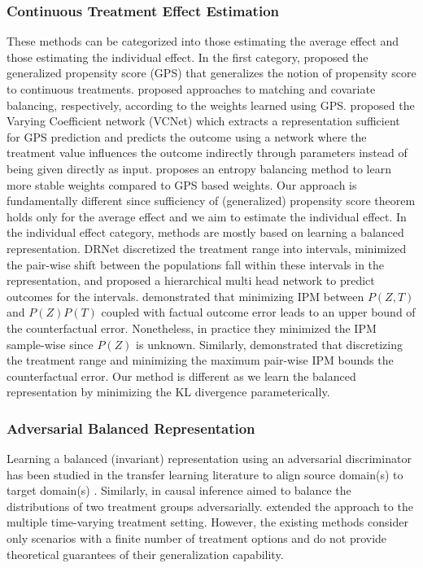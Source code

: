 \documentclass[letterpaper]{article} %
\begin{document}
\subsubsection{Continuous Treatment Effect Estimation}
These methods can be categorized into those estimating the average effect and those estimating the individual effect. In the first category, \cite{hirano2004propensity} proposed the generalized propensity score (GPS) that generalizes the notion of propensity score to continuous treatments. \cite{wu2021matching, fong2018covariate} proposed approaches to matching and covariate balancing, respectively, according to the weights learned using GPS.  \cite{nie2021vcnet} proposed the Varying Coefficient network (VCNet) which extracts a  representation sufficient for GPS prediction and predicts the outcome using a network where the treatment value influences the outcome indirectly through parameters instead of being given directly as input.
\cite{bahadori2022endtoend} proposes an entropy balancing method to learn more stable weights compared to GPS based weights. Our approach is fundamentally different since sufficiency of (generalized) propensity score theorem holds only for the average effect and we aim to estimate the individual effect.
\newline
\newline
In the individual effect category, methods are mostly based on learning a balanced representation. DRNet \cite{Schwab_2020} discretized the treatment range into intervals, minimized the pair-wise shift between the populations fall within these intervals in the representation, and proposed a hierarchical multi head network to predict outcomes for the intervals.  \cite{bellot2022generalization} demonstrated that minimizing IPM between $P(Z, T)$ and $P(Z)P(T)$ coupled with factual outcome error leads to an upper bound of the counterfactual error. Nonetheless, in practice they minimized the IPM sample-wise since $P(Z)$ is unknown. Similarly, \cite{wang2022generalization} demonstrated that discretizing the treatment range and minimizing the maximum pair-wise IPM bounds the counterfactual error. Our method is different as we learn the balanced representation by minimizing the KL divergence parameterically.

\subsubsection{Adversarial Balanced Representation}
Learning a balanced (invariant) representation using an adversarial discriminator has been studied in the transfer learning literature to align source domain(s) to target domain(s) \cite{ganin2016domainadversarial, tzeng2017adversarial, wang2020continuously}. Similarly, in causal inference \cite{Du_2021, NEURIPS2020_e7c573c1} aimed to balance the distributions of two treatment groups adversarially. \cite{CRN} extended the approach to the multiple time-varying treatment setting. However, the existing methods consider only scenarios with a finite number of treatment options and do not provide theoretical guarantees of their generalization capability. 
\end{document}
